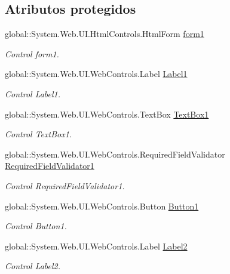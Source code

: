 \subsection*{Atributos protegidos}
\begin{DoxyCompactItemize}
\item 
global\+::\+System.\+Web.\+U\+I.\+Html\+Controls.\+Html\+Form \mbox{\hyperlink{classInicio_1_1CambiarPassword_a14ad331c75f392329019b277a2d2c8d9}{form1}}
\begin{DoxyCompactList}\small\item\em Control form1. \end{DoxyCompactList}\item 
global\+::\+System.\+Web.\+U\+I.\+Web\+Controls.\+Label \mbox{\hyperlink{classInicio_1_1CambiarPassword_ac4c5034d33d8290117987f9fc981e247}{Label1}}
\begin{DoxyCompactList}\small\item\em Control Label1. \end{DoxyCompactList}\item 
global\+::\+System.\+Web.\+U\+I.\+Web\+Controls.\+Text\+Box \mbox{\hyperlink{classInicio_1_1CambiarPassword_ab827a758058e29a7846579183e4cbcea}{Text\+Box1}}
\begin{DoxyCompactList}\small\item\em Control Text\+Box1. \end{DoxyCompactList}\item 
global\+::\+System.\+Web.\+U\+I.\+Web\+Controls.\+Required\+Field\+Validator \mbox{\hyperlink{classInicio_1_1CambiarPassword_a97691c6df6a8a92e71fe388ec90bd635}{Required\+Field\+Validator1}}
\begin{DoxyCompactList}\small\item\em Control Required\+Field\+Validator1. \end{DoxyCompactList}\item 
global\+::\+System.\+Web.\+U\+I.\+Web\+Controls.\+Button \mbox{\hyperlink{classInicio_1_1CambiarPassword_a1fb3744d75ceb088b1368122d0007cee}{Button1}}
\begin{DoxyCompactList}\small\item\em Control Button1. \end{DoxyCompactList}\item 
global\+::\+System.\+Web.\+U\+I.\+Web\+Controls.\+Label \mbox{\hyperlink{classInicio_1_1CambiarPassword_ab4a6fd8e13543ff98bc786be8a2b3a1c}{Label2}}
\begin{DoxyCompactList}\small\item\em Control Label2. \end{DoxyCompactList}\item 

\end{DoxyCompactItemize}
